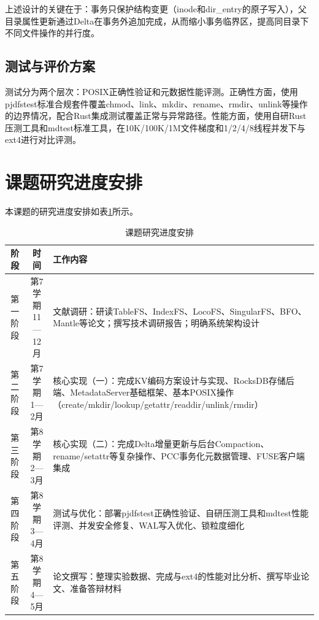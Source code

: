 \documentclass[supercite]{Hust-undergraduate-kaiti}
\theoremstyle{definition}
\begin{document}
上述设计的关键在于：事务只保护结构变更（inode和dir\_entry的原子写入），父目录属性更新通过Delta在事务外追加完成，从而缩小事务临界区，提高同目录下不同文件操作的并行度。

\subsection{测试与评价方案}

测试分为两个层次：POSIX正确性验证和元数据性能评测。正确性方面，使用pjdfstest标准合规套件覆盖chmod、link、mkdir、rename、rmdir、unlink等操作的边界情况，配合Rust集成测试覆盖正常与异常路径。性能方面，使用自研Rust压测工具和mdtest标准工具，在10K/100K/1M文件梯度和1/2/4/8线程并发下与ext4进行对比评测。

\section{课题研究进度安排}

本课题的研究进度安排如表\ref{tbl:schedule}所示。

\begin{table}[htb]
\centering
\caption{课题研究进度安排}
\label{tbl:schedule}
\begin{tabular}{|c|c|p{9cm}|}
\hline
\textbf{阶段} & \textbf{时间} & \textbf{工作内容} \\
\hline
第一阶段 & 第7学期 11—12月 & 文献调研：研读TableFS、IndexFS、LocoFS、SingularFS、BFO、Mantle等论文；撰写技术调研报告；明确系统架构设计 \\
\hline
第二阶段 & 第7学期 1—2月 & 核心实现（一）：完成KV编码方案设计与实现、RocksDB存储后端、MetadataServer基础框架、基本POSIX操作（create/mkdir/lookup/getattr/readdir/unlink/rmdir） \\
\hline
第三阶段 & 第8学期 2—3月 & 核心实现（二）：完成Delta增量更新与后台Compaction、rename/setattr等复杂操作、PCC事务化元数据管理、FUSE客户端集成 \\
\hline
第四阶段 & 第8学期 3—4月 & 测试与优化：部署pjdfstest正确性验证、自研压测工具和mdtest性能评测、并发安全修复、WAL写入优化、锁粒度细化 \\
\hline
第五阶段 & 第8学期 4—5月 & 论文撰写：整理实验数据、完成与ext4的性能对比分析、撰写毕业论文、准备答辩材料 \\
\hline
\end{tabular}
\end{table}

\newpage
\end{document}
